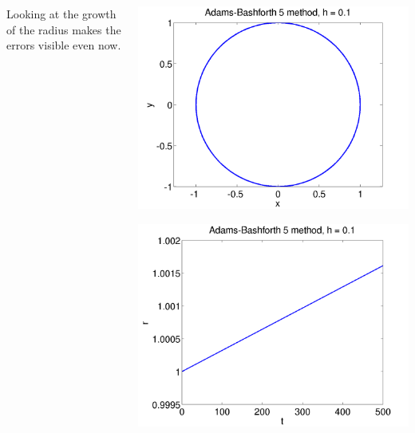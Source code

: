 \documentclass{beamer}
\begin{document}
\begin{frame}
\begin{columns}
\begin{column}{0.5\textwidth}
\begin{overlayarea}{\textwidth}{0.4\textheight}
{          \vspace{1ex}
          Looking at the growth of the radius makes the errors
          visible even now.
        }
      \end{overlayarea}
    \end{column}
    \begin{column}{0.5\textwidth}
      \begin{overlayarea}{\textwidth}{0.6\textheight}
        {
          \begin{center}
            \includegraphics[height=0.5\textheight]{figures/AB5_1}
          \end{center}
        }
        {
          \begin{center}
            \includegraphics[height=0.5\textheight]{figures/AB5_rad1}

\end{center}}
\end{overlayarea}
\end{column}
\end{columns}
\end{frame}
\end{document}
